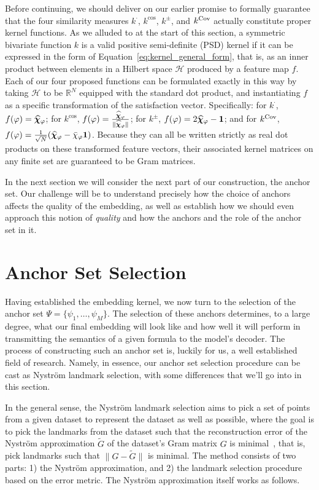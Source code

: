 \documentclass[titlepage,a4paper,11pt]{report}
\begin{document}
    Before continuing, we should deliver on our earlier promise to formally guarantee that the four similarity measures $k^\cdot$, $k^{\cos}$, $k^\pm$, and $k^{\mathrm{Cov}}$ actually constitute proper kernel functions. As we alluded to at the start of this section, a symmetric bivariate function $k$ is a valid positive semi-definite (PSD) kernel if it can be expressed in the form of Equation~\eqref{eq:kernel_general_form}, that is, as an inner product between elements in a Hilbert space $\mathcal{H}$ produced by a feature map $f$. Each of our four proposed functions can be formulated exactly in this way by taking $\mathcal{H}$ to be $\mathbb{R}^N$ equipped with the standard dot product, and instantiating $f$ as a specific transformation of the satisfaction vector. Specifically: for $k^\cdot$, $f(\varphi) = \bm{\widehat\chi}_\varphi$; for $k^{\cos}$, $f(\varphi) = \frac{\bm{\widehat\chi}_\varphi}{\Vert \bm{\widehat\chi}_\varphi \Vert}$; for $k^\pm$, $f(\varphi) = 2\bm{\widehat\chi}_\varphi - \mathbf{1}$; and for $k^{\mathrm{Cov}}$, $f(\varphi) = \frac{1}{\sqrt{N}} (\bm{\widehat\chi}_\varphi - \bar{\chi}_\varphi \mathbf{1})$. Because they can all be written strictly as real dot products on these transformed feature vectors, their associated kernel matrices on any finite set are guaranteed to be Gram matrices.

    In the next section we will consider the next part of our construction, the anchor set. Our challenge will be to understand precisely how the choice of anchors affects the quality of the embedding, as well as establish how we should even approach this notion of \textit{quality} and how the anchors and the role of the anchor set in it.  

    
    \section{Anchor Set Selection}\label{sec:anchor_selection}
    Having established the embedding kernel, we now turn to the selection of the anchor set $\Psi = \{\psi_1, \dots, \psi_M\}$. The selection of these anchors determines, to a large degree, what our final embedding will look like and how well it will perform in transmitting the semantics of a given formula to the model's decoder. The process of constructing such an anchor set is, luckily for us, a well established field of research. Namely, in essence, our anchor set selection procedure can be cast as Nyström landmark selection, with some differences that we'll go into in this section.

    In the general sense, the Nyström landmark selection aims to pick a set of points from a given dataset to represent the dataset as well as possible, where the goal is to pick the landmarks from the dataset such that the reconstruction error of the Nyström approximation $\tilde G$ of the dataset's Gram matrix $G$ is minimal~\citep{belabbas_landmark_2009, drineas_nystrom_2005,kumar_sampling_2012}, that is, pick landmarks such that $\lVert G-\tilde G\rVert$ is minimal. The method consists of two parts: 1) the Nyström approximation, and 2) the landmark selection procedure based on the error metric. The Nyström approximation itself works as follows.
    
\end{document}
